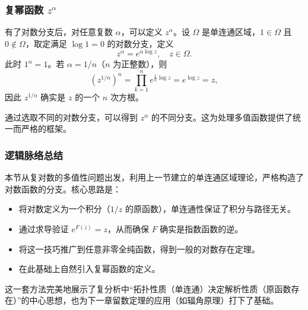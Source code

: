 \documentclass[UTF8]{ctexart}
\numberwithin{equation}{section}
\begin{document}
\subsubsection{复幂函数 $z^\alpha$}

有了对数分支后，对任意复数 $\alpha$，可以定义 $z^\alpha$。设 $\Omega$ 是单连通区域，$1\in\Omega$ 且 $0\notin\Omega$，取定满足 $\log 1=0$ 的对数分支，定义
\[
z^\alpha = e^{\alpha \log z},\quad z\in\Omega .
\]
此时 $1^\alpha = 1$。若 $\alpha=1/n$（$n$ 为正整数），则
\[
(z^{1/n})^n = \prod_{k=1}^n e^{\frac{1}{n}\log z} = e^{\log z} = z ,
\]
因此 $z^{1/n}$ 确实是 $z$ 的一个 $n$ 次方根。

通过选取不同的对数分支，可以得到 $z^\alpha$ 的不同分支。这为处理多值函数提供了统一而严格的框架。

\subsubsection{逻辑脉络总结}

本节从复对数的多值性问题出发，利用上一节建立的单连通区域理论，严格构造了对数函数的分支。核心思路是：

\begin{itemize}
    \item 将对数定义为一个积分（$1/z$ 的原函数），单连通性保证了积分与路径无关。
    \item 通过求导验证 $e^{F(z)}=z$，从而确保 $F$ 确实是指数函数的逆。
    \item 将这一技巧推广到任意非零全纯函数，得到一般的对数存在定理。
    \item 在此基础上自然引入复幂函数的定义。
\end{itemize}

这一套方法完美地展示了复分析中“拓扑性质（单连通）决定解析性质（原函数存在）”的中心思想，也为下一章留数定理的应用（如辐角原理）打下了基础。
\end{document}
